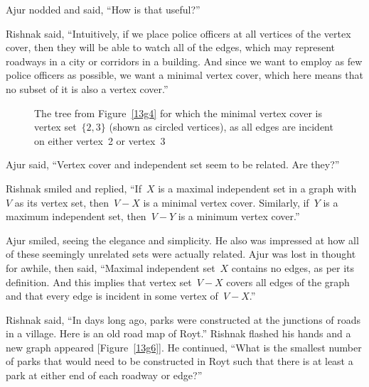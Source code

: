 Ajur nodded and said, ``How is that useful?''

Rishnak said, ``Intuitively, if we place police officers at all vertices of the vertex cover, then they will be able to watch all of the edges, which may represent roadways in a city or corridors in a building. And since we want to employ as few police officers as possible, we want a minimal vertex cover, which here means that no subset of it is also a vertex cover.''

\begin{figure}
\begin{center}

\caption{The tree from Figure~\ref{13g4} for which the minimal vertex cover is vertex set~$\{2,3\}$ (shown as circled vertices), as all edges are incident on either vertex~2 or vertex~3}\label{13g5}
\end{center}
\end{figure}

Ajur said, ``Vertex cover and independent set seem to be related. Are they?''

Rishnak smiled and replied, ``If~$X$ is a maximal independent set in a graph with~$V$ as its vertex set, then~$V-X$ is a minimal vertex cover. Similarly, if~$Y$ is a maximum independent set, then~$V-Y$ is a minimum vertex cover.'' 

Ajur smiled, seeing the elegance and simplicity. He also was impressed at how all of these seemingly unrelated sets were actually related. Ajur was lost in thought for awhile, then said, ``Maximal independent set~$X$ contains no edges, as per its definition. And this implies that vertex set~$V-X$ covers all edges of the graph and that every edge is incident in some vertex of~$V-X$.''

Rishnak said, ``In days long ago, parks were constructed at the junctions of roads in a village. Here is an old road map of Royt.'' Rishnak flashed his hands and a new graph appeared [Figure~\ref{13g6}]. He continued, ``What is the smallest number of parks that would need to be constructed in Royt such that there is at least a park at either end of each roadway or edge?''


